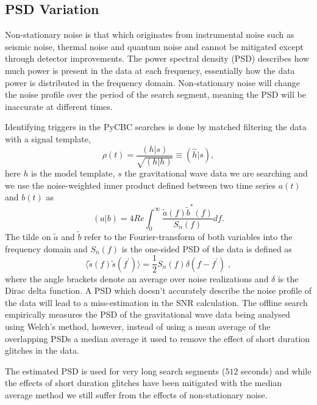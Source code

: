 \subsection{\label{5:sec:psd-var}PSD Variation}

Non-stationary noise is that which originates from instrumental noise such as seismic noise, thermal noise and quantum noise and cannot be mitigated except through detector improvements. The power spectral density (PSD) describes how much power is present in the data at each frequency, essentially how the data power is distributed in the frequency domain. Non-stationary noise will change the noise profile over the period of the search segment, meaning the PSD will be inaccurate at different times. 

Identifying triggers in the PyCBC searches is done by matched filtering the data with a signal template,
%
\begin{equation}
  \rho(t) = \frac{(h | s)}{\sqrt{(h | h)}} \equiv (\hat{h} | s),
  \label{5:eqn:mf_1}
\end{equation}
%
here $h$ is the model template, $s$ the gravitational wave data we are searching and we use the noise-weighted inner product defined between two time series $a(t)$ and $b(t)$ as
%
\begin{equation}
  (a | b) = 4 Re \int^{\infty}_{0} \frac{\tilde{a}(f) \tilde{b}^*(f)}{S_n(f)} 
  df.
  \label{5:eqn:inner_product}
\end{equation}
%
The tilde on $\tilde{a}$ and $\tilde{b}$ refer to the Fourier-transform of both variables into the frequency domain and $S_n(f)$ is the one-sided PSD of the data is defined as
%
\begin{equation}
  \langle \tilde{s}(f) \tilde{s}(f^\prime) \rangle = \frac{1}{2} S_n(f) \delta(f - f^\prime) \;,
  \label{5:eqn:psd}
\end{equation}
%
where the angle brackets denote an average over noise realizations and $\delta$ is the Dirac delta function. A PSD which doesn't accurately describe the noise profile of the data will lead to a miss-estimation in the SNR calculation. The offline search empirically measures the PSD of the gravitational wave data being analysed using Welch's method, however, instead of using a mean average of the overlapping PSDs a median average it used to remove the effect of short duration glitches in the data.

The estimated PSD is used for very long search segments ($512$ seconds) and while the effects of short duration glitches have been mitigated with the median average method we still suffer from the effects of non-stationary noise. 

